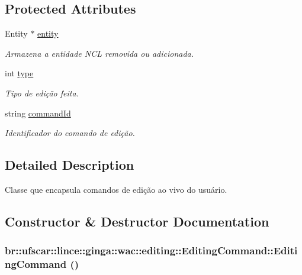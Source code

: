 \subsection*{Protected Attributes}
\begin{DoxyCompactItemize}
\item 
Entity $\ast$ \hyperlink{classbr_1_1ufscar_1_1lince_1_1ginga_1_1wac_1_1editing_1_1EditingCommand_a080922002fe90bf99390c026e8e99e52}{entity}
\begin{DoxyCompactList}\small\item\em Armazena a entidade NCL removida ou adicionada. \item\end{DoxyCompactList}\item 
int \hyperlink{classbr_1_1ufscar_1_1lince_1_1ginga_1_1wac_1_1editing_1_1EditingCommand_a186e9110f8aae8e562761939a85ee83e}{type}
\begin{DoxyCompactList}\small\item\em Tipo de edição feita. \item\end{DoxyCompactList}\item 
string \hyperlink{classbr_1_1ufscar_1_1lince_1_1ginga_1_1wac_1_1editing_1_1EditingCommand_a09a15f483ebab3fc72138c656329b293}{commandId}
\begin{DoxyCompactList}\small\item\em Identificador do comando de edição. \item\end{DoxyCompactList}\end{DoxyCompactItemize}


\subsection{Detailed Description}
Classe que encapsula comandos de edição ao vivo do usuário. 

\subsection{Constructor \& Destructor Documentation}
\hypertarget{classbr_1_1ufscar_1_1lince_1_1ginga_1_1wac_1_1editing_1_1EditingCommand_af99c26529017e3493958d90af9f9142c}{
\subsubsection[{EditingCommand}]{\setlength{\rightskip}{0pt plus 5cm}br::ufscar::lince::ginga::wac::editing::EditingCommand::EditingCommand ()}}
\label{classbr_1_1ufscar_1_1lince_1_1ginga_1_1wac_1_1editing_1_1EditingCommand_af99c26529017e3493958d90af9f9142c}


